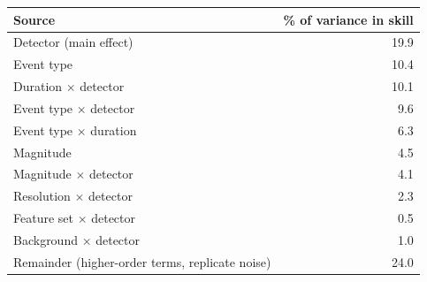 \begin{tabular}{@{}p{}r@{}}
\toprule
Source & \% of variance in skill \\
\midrule
Detector (main effect) & 19.9 \\
Event type & 10.4 \\
Duration $\times$ detector & 10.1 \\
Event type $\times$ detector & 9.6 \\
Event type $\times$ duration & 6.3 \\
Magnitude & 4.5 \\
Magnitude $\times$ detector & 4.1 \\
Resolution $\times$ detector & 2.3 \\
Feature set $\times$ detector & 0.5 \\
Background $\times$ detector & 1.0 \\
Remainder (higher-order terms, replicate noise) & 24.0 \\
\bottomrule
\end{tabular}
